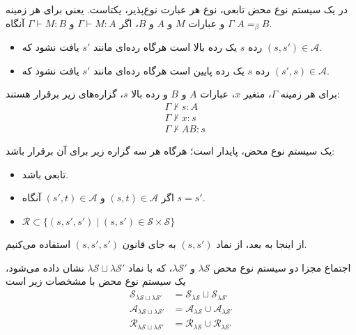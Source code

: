 \begin{lmm}
در یک سیستم نوع محض تابعی، نوع هر عبارت نوع‌پذیر، یکتاست. یعنی برای هر زمینه
$\Gamma$
و عبارات
$M$ و $A$ و $B$،
اگر
$\Gamma \vdash M : A$
و
$\Gamma \vdash M : B$
آنگاه
$A =_\beta B$.
\end{lmm}

\begin{defn}
\hfill
\begin{itemize}
\item رده
$s$
یک رده بالا است هرگاه رده‌ای مانند
$s'$
یافت نشود که
$(s,s') \in \mathcal{A}$.
\item رده
$s$
یک رده پایین است هرگاه رده‌ای مانند
$s'$
یافت نشود که
$(s',s) \in \mathcal{A}$.
\end{itemize}
\end{defn}

\begin{lmm}
برای هر زمینه
$\Gamma$،
متغیر
$x$،
عبارات
$A$ و $B$
و رده بالا
$s$،
گزاره‌های زیر برقرار هستند:
\begin{align*}
&\Gamma \nvdash s:A\\
&\Gamma \nvdash x:s\\
&\Gamma \nvdash AB:s
\end{align*}
\end{lmm}

\begin{defn}
یک سیستم نوع محض، پایدار است؛ هرگاه هر سه گزاره زیر برای آن برقرار باشد:
\begin{itemize}
\item تابعی باشد.
\item اگر $(s,t) \in \mathcal{A}$ و $(s',t) \in \mathcal{A}$ آنگاه $s=s'$.
\item $\mathcal{R} \subset \{(s,s',s') \mid (s,s') \in \mathcal{S} \times \mathcal{S}\}$
\end{itemize}
\end{defn}

\begin{rem}
از اینجا به بعد، از نماد
$(s,s')$
به جای قانون
$(s,s',s')$
استفاده می‌کنیم.
\end{rem}

\begin{defn}
اجتماع مجزا دو سیستم نوع محض
$\lambda\mathcal{S}$ و $\lambda\mathcal{S'}$،
که با نماد
$\lambda\mathcal{S} \sqcup \lambda\mathcal{S'}$
نشان داده می‌شود، یک سیستم نوع محض با مشخصات زیر است
\begin{align*}
\mathcal{S}_{\lambda\mathcal{S} \sqcup \lambda\mathcal{S'}} &= \mathcal{S}_{\lambda\mathcal{S}} \sqcup \mathcal{S}_{\lambda\mathcal{S'}}\\
\mathcal{A}_{\lambda\mathcal{S} \sqcup \lambda\mathcal{S'}} &= \mathcal{A}_{\lambda\mathcal{S}} \cup \mathcal{A}_{\lambda\mathcal{S'}}\\
\mathcal{R}_{\lambda\mathcal{S} \sqcup \lambda\mathcal{S'}} &= \mathcal{R}_{\lambda\mathcal{S}} \cup \mathcal{R}_{\lambda\mathcal{S'}}
\end{align*}
\end{defn}

